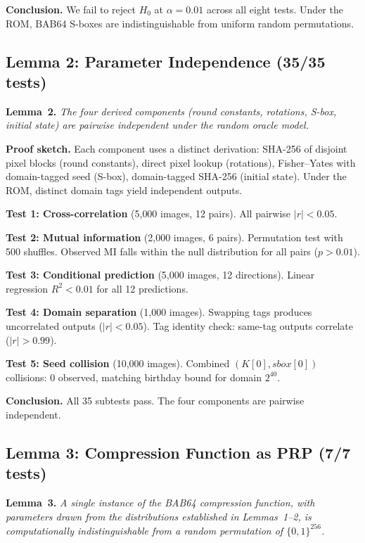 \documentclass[preprint]{iacrtrans}
\begin{document}
\textbf{Conclusion.} We fail to reject $H_0$ at $\alpha = 0.01$ across all eight tests. Under the ROM, BAB64 S-boxes are indistinguishable from uniform random permutations.

\subsection{Lemma 2: Parameter Independence (35/35 tests)}

\textbf{Lemma~2.} \emph{The four derived components (round constants, rotations, S-box, initial state) are pairwise independent under the random oracle model.}

\textbf{Proof sketch.} Each component uses a distinct derivation: SHA-256 of disjoint pixel blocks (round constants), direct pixel lookup (rotations), Fisher--Yates with domain-tagged seed (S-box), domain-tagged SHA-256 (initial state). Under the ROM, distinct domain tags yield independent outputs.

\textbf{Test 1: Cross-correlation} (5{,}000 images, 12 pairs). All pairwise $|r| < 0.05$.

\textbf{Test 2: Mutual information} (2{,}000 images, 6 pairs). Permutation test with 500 shuffles. Observed MI falls within the null distribution for all pairs ($p > 0.01$).

\textbf{Test 3: Conditional prediction} (5{,}000 images, 12 directions). Linear regression $R^2 < 0.01$ for all 12 predictions.

\textbf{Test 4: Domain separation} (1{,}000 images). Swapping tags produces uncorrelated outputs ($|r| < 0.05$). Tag identity check: same-tag outputs correlate ($|r| > 0.99$).

\textbf{Test 5: Seed collision} (10{,}000 images). Combined $(K[0], \mathit{sbox}[0])$ collisions: 0 observed, matching birthday bound for domain $2^{40}$.

\textbf{Conclusion.} All 35 subtests pass. The four components are pairwise independent.

\subsection{Lemma 3: Compression Function as PRP (7/7 tests)}

\textbf{Lemma~3.} \emph{A single instance of the BAB64 compression function, with parameters drawn from the distributions established in Lemmas~1--2, is computationally indistinguishable from a random permutation of $\{0,1\}^{256}$.}
\end{document}
